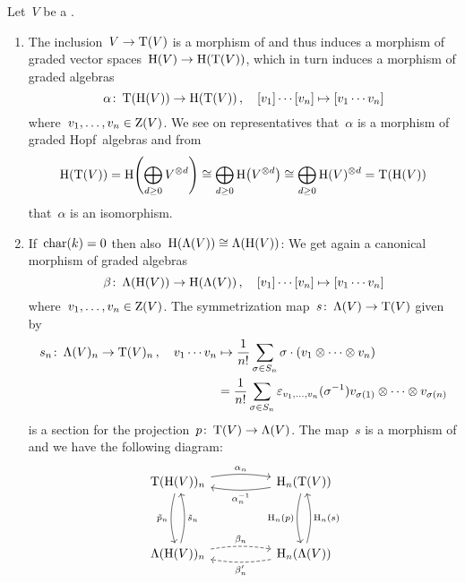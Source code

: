 \documentclass[a4paper,10pt,headings=standardclasses]{scrartcl}
\begin{document}
\begin{example}
  \label{homology of tensor and symmetric}
  Let~$V$ be a {\dgv}.
  \begin{enumerate}
    \item
      The inclusion~$V \to \operatorname{T}(V)$ is a morphism of {\dgvs} and thus induces a morphism of graded vector spaces~$\operatorname{H}(V) \to \operatorname{H}(\operatorname{T}(V))$, which in turn induces a morphism of graded algebras
      \[
        \alpha
        \colon
        \operatorname{T}(\operatorname{H}(V))
        \to
        \operatorname{H}(\operatorname{T}(V)) \,,
        \quad
        [v_1] \dotsm [v_n]
        \mapsto
        [v_1 \dotsm v_n]
      \]
      where~$v_1, \dotsc, v_n \in \operatorname{Z}(V)$.
      We see on representatives that~$\alpha$ is a morphism of graded Hopf~algebras and from
      \[
        \operatorname{H}(\operatorname{T}(V))
        =
        \operatorname{H}\Biggl( \bigoplus_{d \geq 0} V^{\otimes d} \Biggr)
        \cong
        \bigoplus_{d \geq 0} \operatorname{H}\bigl( V^{\otimes d} \bigr)
        \cong
        \bigoplus_{d \geq 0} \operatorname{H}(V)^{\otimes d}
        =
        \operatorname{T}(\operatorname{H}(V))
      \]
      that~$\alpha$ is an isomorphism.
    \item
      If~$\operatorname{char}(k) = 0$ then also~$\operatorname{H}(\operatorname{\Lambda}(V)) \cong \operatorname{\Lambda}(\operatorname{H}(V))$:
      We get again a canonical morphism of graded algebras
      \[
        \beta
        \colon
        \operatorname{\Lambda}(\operatorname{H}(V))
        \to
        \operatorname{H}(\operatorname{\Lambda}(V)) \,,
        \quad
        [v_1] \dotsm [v_n]
        \mapsto
        [v_1 \dotsm v_n]
      \]
      where~$v_1, \dotsc, v_n \in \operatorname{Z}(V)$.
      The symmetrization map~$s \colon \operatorname{\Lambda}(V) \to \operatorname{T}(V)$ given by
      \begin{align*}
        s_n
        \colon
        \operatorname{\Lambda}(V)_n
        \to
        \operatorname{T}(V)_n \,,
        \quad
        v_1 \dotsm v_n
        &\mapsto
        \frac{1}{n!} \sum_{\sigma \in S_n}
        \sigma \cdot (v_1 \otimes \dotsb \otimes v_n)
        \\
        &=
        \frac{1}{n!}
        \sum_{\sigma \in S_n}
        \varepsilon_{v_1, \dotsc, v_n}(\sigma^{-1})
        v_{\sigma(1)} \otimes \dotsb \otimes v_{\sigma(n)}
      \end{align*}
      is a section for the projection~$p \colon \operatorname{T}(V) \to \operatorname{\Lambda}(V)$.
      The map~$s$ is a morphism of {\dgvs} and we have the following diagram:
      \[
        \begin{tikzcd}[column sep = huge, row sep = 4em]
          \dgTensor(\homology(V))_n
          \arrow[bend left = 9]{r}[above]{\alpha_n}
          \arrow[bend right = 15]{d}[left]{\tilde{p}_n}
          &
          \homology_n(\dgTensor(V))
          \arrow[bend left = 9]{l}[below]{\alpha_n^{-1}}
          \arrow[bend right = 15]{d}[left]{\homology_n(p)}
          \\
          \dgSymm(\homology(V))_n
          \arrow[bend right = 15]{u}[right]{\tilde{s}_n}
          \arrow[dashed, bend left = 9]{r}[above]{\beta_n}
          &
          \homology_n(\dgSymm(V))
          \arrow[bend right = 15]{u}[right]{\homology_n(s)}
          \arrow[dashed, bend left = 9]{l}[below]{\beta'_n}
        \end{tikzcd}
      \]


\end{enumerate}
\end{example}
\end{document}
